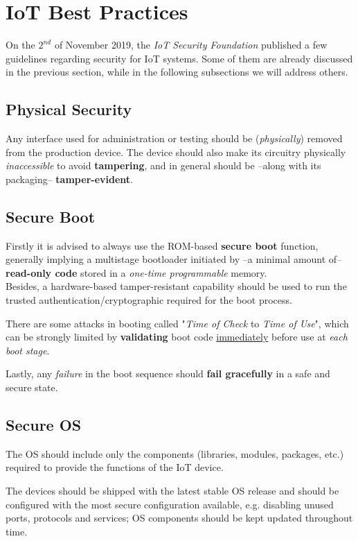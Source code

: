 \section{IoT Best Practices}
On the $2^{nd}$ of November 2019,
the \textit{IoT Security Foundation} published a few guidelines regarding security for IoT systems.
Some of them are already discussed in the previous section, while in the following subsections we will address others.
\subsection{Physical Security}

Any interface used for administration  or testing should be (\textit{physically}) removed from the production device. 
The device should also make its circuitry physically \textit{inaccessible} to avoid \textbf{tampering},
and in general should be {--}along with its packaging{--} \textbf{tamper-evident}.  

\subsection{Secure Boot}
Firstly it is advised to always use the ROM-based \textbf{secure boot} function, generally implying a multistage bootloader initiated by {--}a minimal amount of{--} \textbf{read-only code} stored in a \textit{one-time programmable} memory.\\
Besides, a hardware-based tamper-resistant capability should be used to run the trusted authentication/cryptographic required for the boot process.

There are some attacks in booting called "\textit{Time of Check} to \textit{Time of Use}", which can be strongly limited by \textbf{validating} boot code \underline{immediately} before use at \textit{each boot stage}.

Lastly, any \textit{failure} in the boot sequence should \textbf{fail gracefully} in a safe and secure state.

\subsection{Secure OS}
The OS should include only the components (libraries, modules, packages, etc.) required to provide the functions of the IoT device.

The devices should be shipped with the latest stable OS release and should be configured with the most secure configuration available, e.g. disabling unused ports, protocols and services;
OS components should be kept updated throughout time.

